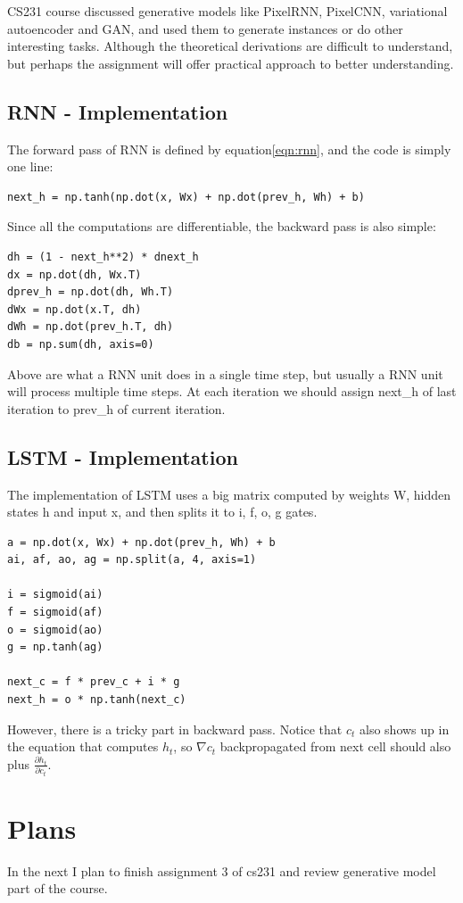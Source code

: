 \documentclass{article} %
\begin{document}
CS231 course discussed generative models like PixelRNN, PixelCNN, variational autoencoder and GAN, and used them to generate instances or do other interesting tasks. Although the theoretical derivations are difficult to understand, but perhaps the assignment will offer practical approach to better understanding.

\subsection{RNN - Implementation}
The forward pass of RNN is defined by equation\eqref{eqn:rnn}, and the code is simply one line:
\begin{lstlisting}
next_h = np.tanh(np.dot(x, Wx) + np.dot(prev_h, Wh) + b)
\end{lstlisting}

Since all the computations are differentiable, the backward pass is also simple:
\begin{lstlisting}
dh = (1 - next_h**2) * dnext_h
dx = np.dot(dh, Wx.T)
dprev_h = np.dot(dh, Wh.T)
dWx = np.dot(x.T, dh)
dWh = np.dot(prev_h.T, dh)
db = np.sum(dh, axis=0)
\end{lstlisting}

Above are what a RNN unit does in a single time step, but usually a RNN unit will process multiple time steps. At each iteration we should assign next\_h of last iteration to prev\_h of current iteration.

\subsection{LSTM - Implementation}
The implementation of LSTM uses a big matrix computed by weights W, hidden states h and input x, and then splits it to i, f, o, g gates.
\begin{lstlisting}
a = np.dot(x, Wx) + np.dot(prev_h, Wh) + b
ai, af, ao, ag = np.split(a, 4, axis=1)

i = sigmoid(ai)
f = sigmoid(af)
o = sigmoid(ao)
g = np.tanh(ag)

next_c = f * prev_c + i * g
next_h = o * np.tanh(next_c)
\end{lstlisting}

However, there is a tricky part in backward pass. Notice that $c_t$ also shows up in the equation that computes $h_t$, so $\nabla c_t$ backpropagated from next cell should also plus $\frac{\partial h_t}{\partial c_t}$.

\section{Plans}
In the next I plan to finish assignment 3 of cs231 and review generative model part of the course.
\end{document}
